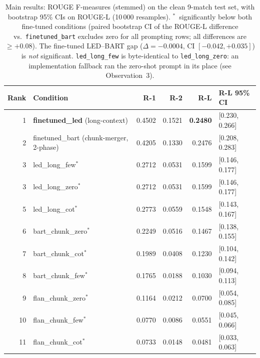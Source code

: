 \documentclass[10pt,a4paper]{article}
\begin{document}
\begin{table}[h]
\centering\small
\begin{tabular}{rlrrrl}
\toprule
\textbf{Rank} & \textbf{Condition} & \textbf{R-1} & \textbf{R-2} & \textbf{R-L} & \textbf{R-L 95\% CI} \\
\midrule
1 & \textbf{finetuned\_led} (long-context)           & 0.4502 & 0.1521 & \textbf{0.2480} & [0.230, 0.266] \\
\rowcolor{gray!12} 2 & finetuned\_bart (chunk-merger, 2-phase) & 0.4205 & 0.1330 & 0.2476 & [0.208, 0.283] \\
3 & led\_long\_few$^{*}$                             & 0.2712 & 0.0531 & 0.1599 & [0.146, 0.177] \\
3 & led\_long\_zero$^{*}$                            & 0.2712 & 0.0531 & 0.1599 & [0.146, 0.177] \\
5 & led\_long\_cot$^{*}$                             & 0.2773 & 0.0559 & 0.1548 & [0.143, 0.167] \\
6 & bart\_chunk\_zero$^{*}$                          & 0.2249 & 0.0516 & 0.1467 & [0.138, 0.155] \\
7 & bart\_chunk\_cot$^{*}$                           & 0.1989 & 0.0408 & 0.1230 & [0.104, 0.142] \\
8 & bart\_chunk\_few$^{*}$                           & 0.1765 & 0.0188 & 0.1030 & [0.094, 0.113] \\
9 & flan\_chunk\_zero$^{*}$                          & 0.1164 & 0.0212 & 0.0700 & [0.054, 0.085] \\
10 & flan\_chunk\_few$^{*}$                          & 0.0770 & 0.0086 & 0.0551 & [0.045, 0.066] \\
11 & flan\_chunk\_cot$^{*}$                          & 0.0733 & 0.0148 & 0.0481 & [0.033, 0.063] \\
\bottomrule
\end{tabular}
\caption{Main results: ROUGE F-measures (stemmed) on the clean 9-match test set, with bootstrap 95\% CIs on ROUGE-L (10\,000 resamples). $^{*}$~significantly below both fine-tuned conditions (paired bootstrap CI of the ROUGE-L difference vs.\ \texttt{finetuned\_bart} excludes zero for all prompting rows; all differences are $\ge +0.08$). The fine-tuned LED--BART gap ($\Delta = -0.0004$, CI $[-0.042, +0.035]$) is \emph{not} significant. \texttt{led\_long\_few} is byte-identical to \texttt{led\_long\_zero}: an implementation fallback ran the zero-shot prompt in its place (see Observation~3).}
\label{tab:main}
\end{table}
\end{document}
